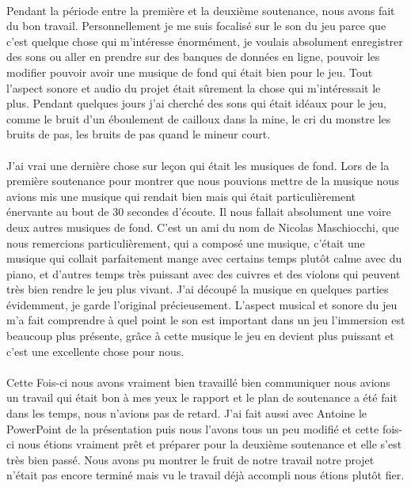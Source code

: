 \documentclass[titlepage, 13px, a4paper]{report}
\begin{document}
\paragraph{} \hspace{0pt}
Pendant la période entre la première et la deuxième soutenance, 
nous avons fait du bon travail. Personnellement je me suis focalisé sur 
le son du jeu parce que c’est quelque chose qui m’intéresse énormément, je voulais absolument enregistrer 
des sons ou aller en prendre sur des banques de données en ligne, pouvoir les modifier pouvoir avoir une 
musique de fond qui était bien pour le jeu. Tout l’aspect sonore et audio du projet était sûrement 
la chose qui m’intéressait le plus. Pendant quelques jours j’ai cherché des sons qui était idéaux pour le jeu, 
comme le bruit d’un éboulement de cailloux dans la mine, le cri du monstre les bruits de pas, les bruits de pas 
quand le mineur court. \\ \\
J’ai vrai une dernière chose sur leçon 
qui était les musiques de fond. Lors de la première soutenance pour montrer que nous pouvions mettre de la 
musique nous avions mis une musique qui rendait bien mais qui était particulièrement énervante au bout de 30 secondes 
d’écoute. Il nous fallait absolument une voire deux autres musiques de fond. C’est un ami du nom de 
Nicolas Maschiocchi, que nous remercions particulièrement, qui a composé une musique, c’était une musique 
qui collait parfaitement mange avec certains temps plutôt calme avec du piano, et d’autres temps très puissant 
avec des cuivres et des violons qui peuvent très bien rendre le jeu plus vivant. J’ai découpé la musique en 
quelques parties évidemment, je garde l’original précieusement. L’aspect musical et sonore du jeu m’a fait 
comprendre à quel point le son est important dans un jeu l’immersion est beaucoup plus présente, grâce à 
cette musique le jeu en devient plus puissant et c’est une excellente chose pour nous. \\ \\
Cette Fois-ci nous avons vraiment bien travaillé bien communiquer nous avions un travail qui était bon à mes yeux 
le rapport et le plan de soutenance a été fait dans les temps, nous n’avions pas de retard. J’ai fait aussi avec 
Antoine le PowerPoint de la présentation puis nous l’avons tous un peu modifié et cette fois-ci nous étions vraiment 
prêt et préparer pour la deuxième soutenance et elle s’est très bien passé. Nous avons pu montrer le fruit de notre 
travail notre projet n’était pas encore terminé mais vu le travail déjà accompli nous étions plutôt fier. \\
\end{document}
